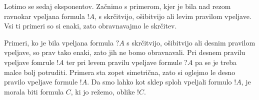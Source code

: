 \begin{prooftree}

\end{prooftree}
\dol
\begin{prooftree}

\end{prooftree}
Lotimo se sedaj eksponentov. Začnimo s primerom, kjer je bila nad rezom ravnokar vpeljana formula $!A$, s skrčitvijo, ošibitvijo ali levim pravilom vpeljave. Vsi ti primeri so si enaki, zato obravnavajmo le skrčitev.
\begin{prooftree}

\end{prooftree}
\dol
\begin{prooftree}
\end{prooftree}
Primeri, ko je bila vpeljana formula $?A$ s skrčitvijo, ošibitvijo ali desnim pravilom vpeljave, so prav tako enaki, zato jih ne bomo obravnavali.
Pri desnem pravilu vpeljave fomrule $!A$ ter pri levem pravilu vpeljave formule $?A$ pa se je treba malce bolj potruditi. Primera sta zopet simetrična, zato si oglejmo le desno pravilo vpeljave formule $!A$. Da smo lahko kot sklep sploh vpeljali formulo $!A$, je morala biti formula $C$, ki jo režemo, oblike $!C$.
\begin{prooftree}

\end{prooftree}

